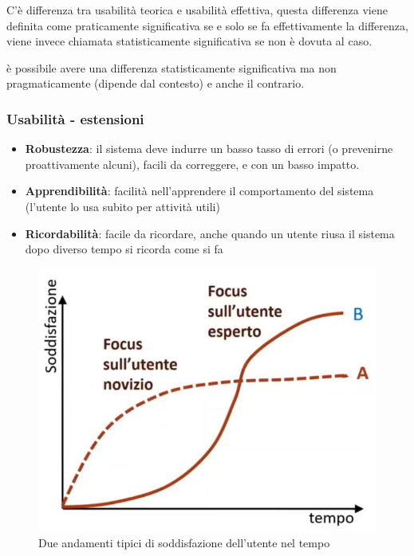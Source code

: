 \documentclass[11pt,a4paper]{book}
\begin{document}
C'è differenza tra usabilità teorica e usabilità effettiva, questa differenza viene definita come praticamente significativa se e solo se fa effettivamente la differenza, viene invece chiamata statisticamente significativa se non è dovuta al caso.

è possibile avere una differenza statisticamente significativa ma non pragmaticamente (dipende dal contesto) e anche il contrario.

\subsubsection{Usabilità - estensioni}
\begin{itemize}
	\item \textbf{Robustezza}: il sistema deve indurre un basso tasso di errori (o prevenirne proattivamente alcuni), facili da correggere, e con un basso impatto. 
	\item \textbf{Apprendibilità}: facilità nell'apprendere il comportamento del sistema (l'utente lo usa subito per attività utili)
	\item \textbf{Ricordabilità}: facile da ricordare, anche quando un utente riusa il sistema dopo diverso tempo si ricorda come si fa
\end{itemize}

\begin{figure}[h!]
	\begin{center}
		\includegraphics[scale=0.6]{img/021.jpg}
		\caption{Due andamenti tipici di soddisfazione dell'utente nel tempo}
		\label{fig: 021}
	\end{center}
\end{figure}
\end{document}
